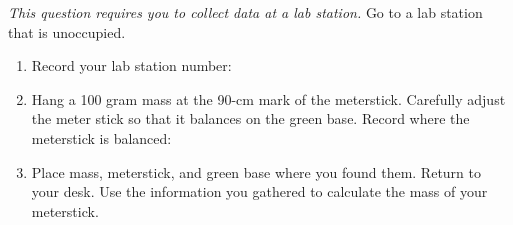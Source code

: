 \documentclass[10pt]{examdesign}
\begin{document}
\begin{shortanswer}[title={Free Response}, rearrange=NO]
	\begin{question}
	\textit{This question requires you to collect data at a lab station.}  Go to a lab station that is unoccupied.
	\begin{enumerate}
		\item Record your lab station number:
		\item Hang a 100 gram mass at the 90-cm mark of the meterstick.  Carefully adjust the meter stick so that it balances on the green base.  Record where the meterstick is balanced:
		\item Place mass, meterstick, and green base where you found them. Return to your desk.  Use the information you gathered to calculate the mass of your meterstick. 
		\vspace{1in}
	\end{enumerate} 

	\end{question}



\end{shortanswer}
\end{document}
